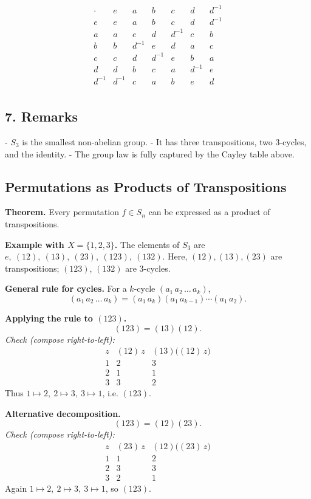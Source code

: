 \documentclass[12pt]{article}
\begin{document}
	\[
	\begin{array}{c|c|c|c|c|c|c}
		\cdot & e & a & b & c & d & d^{-1} \\ \hline
		e & e & a & b & c & d & d^{-1} \\ \hline
		a & a & e & d & d^{-1} & c & b \\ \hline
		b & b & d^{-1} & e & d & a & c \\ \hline
		c & c & d & d^{-1} & e & b & a \\ \hline
		d & d & b & c & a & d^{-1} & e \\ \hline
		d^{-1} & d^{-1} & c & a & b & e & d \\
	\end{array}
	\]
	
	\subsection*{7. Remarks}
	
	- $S_3$ is the smallest non-abelian group.  
	- It has three transpositions, two $3$-cycles, and the identity.  
	- The group law is fully captured by the Cayley table above.
	
	\subsection*{Permutations as Products of Transpositions}
	
	\noindent\textbf{Theorem.}
	Every permutation \(f \in S_n\) can be expressed as a product of transpositions.
	
	\medskip
	\noindent\textbf{Example with \(X=\{1,2,3\}\).}
	The elements of \(S_3\) are
	\(e,\ (12),\ (13),\ (23),\ (123),\ (132)\).
	Here, \((12),(13),(23)\) are transpositions; \((123)\), \((132)\) are $3$-cycles.
	
	\medskip
	\noindent\textbf{General rule for cycles.}
	For a $k$-cycle \((a_1\,a_2\,\dots\,a_k)\),
	\[
	(a_1\,a_2\,\dots\,a_k)=(a_1\,a_k)(a_1\,a_{k-1})\cdots(a_1\,a_2).
	\]
	
	\medskip
	\noindent\textbf{Applying the rule to \((123)\).}
	\[
	(123)=(13)(12).
	\]
	\textit{Check (compose right-to-left):}
	\[
	\begin{array}{c|cc}
		z & (12)\,z & (13)\big((12)\,z\big)\\\hline
		1 & 2 & 3\\
		2 & 1 & 1\\
		3 & 3 & 2
	\end{array}
	\]
	Thus \(1\mapsto2,\ 2\mapsto3,\ 3\mapsto1\), i.e. \((123)\).
	
	\medskip
	\noindent\textbf{Alternative decomposition.}
	\[
	(123)=(12)(23).
	\]
	\textit{Check (compose right-to-left):}
	\[
	\begin{array}{c|cc}
		z & (23)\,z & (12)\big((23)\,z\big)\\\hline
		1 & 1 & 2\\
		2 & 3 & 3\\
		3 & 2 & 1
	\end{array}
	\]
	Again \(1\mapsto2,\ 2\mapsto3,\ 3\mapsto1\), so \((123)\).
	
	
\end{document}
